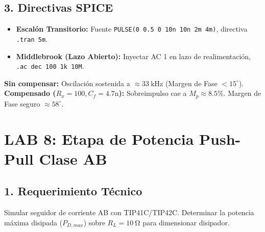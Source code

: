 \documentclass[11pt,a4paper,twoside]{article}
\newcommand{\param}[1]{\texttt{\color{spicered}#1}}
\begin{document}
\subsection{3. Directivas SPICE}
\begin{spicecmd}
\begin{itemize}[itemsep=1pt]
    \item \textbf{Escalón Transitorio:} Fuente \param{PULSE(0 0.5 0 10n 10n 2m 4m)}, directiva \param{.tran 5m}.
    \item \textbf{Middlebrook (Lazo Abierto):} Inyectar AC 1 en lazo de realimentación, \param{.ac dec 100 1k 10M}.
\end{itemize}
\end{spicecmd}

\begin{resultado}
\textbf{Sin compensar:} Oscilación sostenida a $\approx \qty{33}{\kilo\hertz}$ (Margen de Fase $< 15^\circ$).\\
\textbf{Compensado ($R_x=100, C_f=4.7\text{n}$):} Sobreimpulso cae a $M_p \approx 8.5\%$. Margen de Fase seguro $\approx 58^\circ$.
\end{resultado}

\newpage
\section{LAB 8: Etapa de Potencia Push-Pull Clase AB}\label{lab8}

\subsection{1. Requerimiento Técnico}
Simular seguidor de corriente AB con TIP41C/TIP42C. Determinar la potencia máxima disipada ($P_{D,max}$) sobre $R_L = \qty{10}{\ohm}$ para dimensionar disipador.
\end{document}
